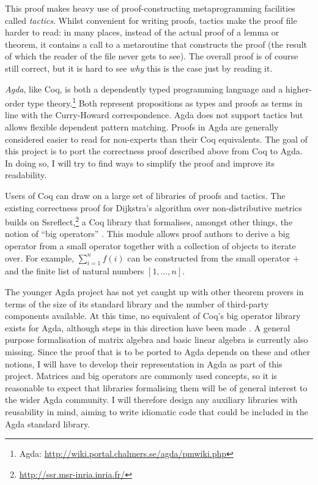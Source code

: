 \documentclass[a4paper]{scrartcl}
\begin{document}
This proof makes heavy use of proof-constructing metaprogramming facilities called \emph{tactics}. Whilst convenient for writing proofs, tactics make the proof file harder to read: in many places, instead of the actual proof of a lemma or theorem, it contains a call to a metaroutine that constructs the proof (the result of which the reader of the file never gets to see). The overall proof is of course still correct, but it is hard to see \emph{why} this is the case just by reading it.

\emph{Agda}, like Coq, is both a dependently typed programming language and a higher-order type theory.\footnote{Agda: \url{http://wiki.portal.chalmers.se/agda/pmwiki.php}} Both represent propositions as types and proofs as terms in line with the Curry-Howard correspondence.
Agda does not support tactics but allows flexible dependent pattern matching. Proofs in Agda are generally considered easier to read for non-experts than their Coq equivalents. The goal of this project is to port the correctness proof described above from Coq to Agda. In doing so, I will try to find ways to simplify the proof and improve its readability.

Users of Coq can draw on a large set of libraries of proofs and tactics. The existing correctness proof for Dijkstra's algorithm over non-distributive metrics builds on Ssreflect,\footnote{\url{http://ssr.msr-inria.inria.fr/}} a Coq library that formalises, amongst other things, the notion of \enquote{big operators} \autocite{bertot_canonical_2008}. This module allows proof authors to derive a big operator from a small operator together with a collection of objects to iterate over. For example, \(\sum_{i=1}^n f(i)\) can be constructed from the small operator \(+\) and the finite list of natural numbers \([1, \dots, n]\).

The younger Agda project has not yet caught up with other theorem provers in terms of the size of its standard library and the number of third-party components available. At this time, no equivalent of Coq's big operator library exists for Agda, although steps in this direction have been made \autocite{gustafsson_foldable_2014}. A general purpose formalisation of matrix algebra and basic linear algebra is currently also missing. Since the proof that is to be ported to Agda depends on these and other notions, I will have to develop their representation in Agda as part of this project. Matrices and big operators are commonly used concepts, so it is reasonable to expect that libraries formalising them will be of general interest to the wider Agda community. I will therefore design any auxiliary libraries with reusability in mind, aiming to write idiomatic code that could be included in the Agda standard library.
\end{document}
